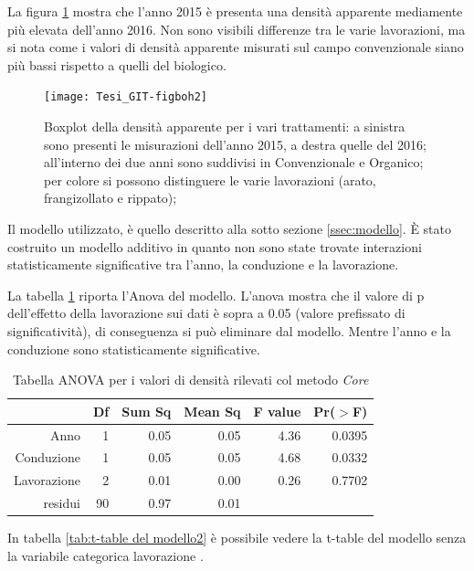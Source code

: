 \documentclass[11pt, a4paper, openright, titlepage, final, language = italian]{book}
\begin{document}
La figura \ref{fig:boxplotCore} mostra che l'anno 2015 \`e presenta
una densit\`a apparente mediamente pi\`u elevata dell'anno 2016. Non
sono visibili differenze tra le varie lavorazioni, ma si nota come i
valori di densit\`a apparente misurati sul campo convenzionale siano
pi\`u bassi rispetto a quelli del biologico.



\begin{figure}[hb]
  \centering
\texttt{[image: Tesi\_GIT-figboh2]}

\caption{Boxplot della densit\`a apparente per i vari trattamenti: 
  a sinistra sono presenti le misurazioni dell'anno 2015, a destra quelle del 2016; 
  all'interno dei due anni sono suddivisi in Convenzionale e Organico; 
  per colore si possono distinguere le varie lavorazioni (arato, frangizollato e rippato);
  }
  
  \label{fig:boxplotCore}
\end{figure}
\FloatBarrier


Il modello utilizzato, \`e quello descritto alla sotto sezione
\ref{ssec:modello}. \`E stato costruito un modello additivo in quanto non
sono state trovate interazioni statisticamente significative tra
l'anno, la conduzione e la lavorazione.

La tabella \ref{tab:anova del modello} riporta l'Anova del
modello. L'anova mostra che il valore di p dell'effetto della lavorazione
sui dati \`e sopra a 0.05 (valore prefissato di significativit\`a), di
conseguenza si pu\`o eliminare dal modello. Mentre l'anno e la
conduzione sono statisticamente significative.


\begin{table}[ht]
\centering
\caption{Tabella ANOVA per i valori di densità rilevati col metodo \emph{Core}} 
\label{tab:anova del modello}
\begin{tabular}{rrrrrr}
  \hline
 & Df & Sum Sq & Mean Sq & F value & Pr($>$F) \\ 
  \hline
Anno & 1 & 0.05 & 0.05 & 4.36 & 0.0395 \\ 
  Conduzione & 1 & 0.05 & 0.05 & 4.68 & 0.0332 \\ 
  Lavorazione & 2 & 0.01 & 0.00 & 0.26 & 0.7702 \\ 
  residui & 90 & 0.97 & 0.01 &  &  \\ 
   \hline
\end{tabular}
\end{table}
In tabella \ref{tab:t-table del modello2} \`e possibile vedere la
t-table del modello senza la variabile categorica lavorazione
.
\end{document}
